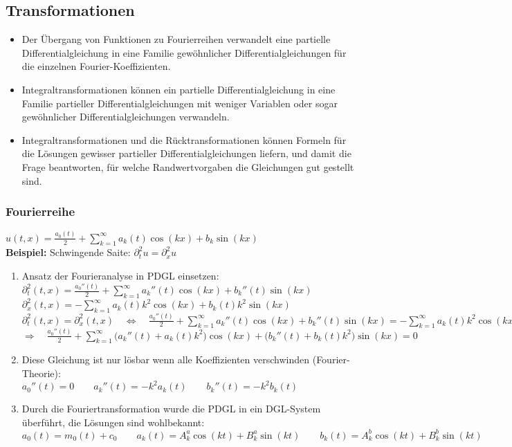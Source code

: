 \subsection{Transformationen}


\begin{itemize}
\item Der Übergang von Funktionen zu Fourierreihen verwandelt eine partielle
Differentialgleichung in eine Familie gewöhnlicher Differentialgleichungen für
die einzelnen Fourier-Koeffizienten.
\item Integraltransformationen können ein partielle Differentialgleichung in eine
Familie partieller Differentialgleichungen mit weniger Variablen oder sogar
gewöhnlicher Differentialgleichungen verwandeln.
\item Integraltransformationen und die Rücktransformationen können Formeln
für die Lösungen gewisser partieller Differentialgleichungen liefern, und
damit die Frage beantworten, für welche Randwertvorgaben die Gleichungen
gut gestellt sind.
\end{itemize}

\subsubsection{Fourierreihe}

$\boxed{u(t,x)=\frac{a_0(t)}{2}+\sum\limits_{k=1}^{\infty}{a_k(t)\cos(kx)+b_k\sin(kx)}}$\\[0.4cm]

\textbf{Beispiel:} Schwingende Saite: $\boxed{\partial_t^2u=\partial_x^2u}$

\begin{enumerate}
\item Ansatz der Fourieranalyse in PDGL einsetzen:\\
$\partial_t^2(t,x)=\frac{a_0''(t)}{2}+\sum\limits_{k=1}^{\infty}{a_k''(t)\cos(kx)+b_k''(t)\sin(kx)}$\\
$\partial_x^2(t,x)=-\sum\limits_{k=1}^{\infty}{a_k(t)k^2\cos(kx)+b_k(t)k^2\sin(kx)}$\\
$\partial_t^2(t,x)=\partial_x^2(t,x) 
\quad \Leftrightarrow \quad \frac{a_0''(t)}{2}+\sum\limits_{k=1}^{\infty}{a_k''(t)\cos(kx)+b_k''(t)\sin(kx)}=-\sum\limits_{k=1}^{\infty}{a_k(t)k^2\cos(kx)+b_k(t)k^2\sin(kx)}$\\[0.2cm]
$\boxed{\Rightarrow\quad \frac{a_0''(t)}{2}+\sum\limits_{k=1}^{\infty}{\big(a_k''(t)+a_k(t)k^2\big)\cos(kx)+\big(b_k''(t)+b_k(t)k^2\big)\sin(kx)}=0}$
\item Diese Gleichung ist nur lösbar wenn alle Koeffizienten verschwinden (Fourier-Theorie):\\[0.2cm]
$a_0''(t)=0 \qquad a_k''(t)=-k^2a_k(t)\qquad b_k''(t)=-k^2b_k(t)$
\item Durch die Fouriertransformation wurde die PDGL in ein DGL-System überführt, die Lösungen sind wohlbekannt:\\[0.2cm]
$a_0(t)=m_0(t)+c_0\qquad a_k(t)=A_k^a\cos(kt)+B_k^a\sin(kt)\qquad b_k(t)=A_k^b\cos(kt)+B_k^b\sin(kt)$
\end{enumerate}


